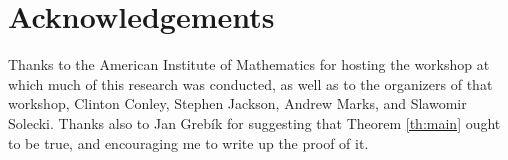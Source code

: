 \documentclass[11pt]{amsart}
\theoremstyle{definition}
\begin{document}
\section*{Acknowledgements} 

Thanks to the American Institute of Mathematics for hosting the workshop at which much of this research was conducted, as well as to the organizers of that workshop, Clinton Conley, Stephen Jackson, Andrew Marks, and Slawomir Solecki. Thanks also to Jan Greb\'{i}k for suggesting that Theorem \ref{th:main} ought to be true, and encouraging me to write up the proof of it.

 

 
\end{document}
